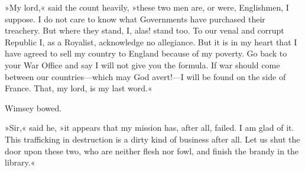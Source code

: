 »My lord,« said the count heavily, »these two men are, or were, Englishmen, I suppose. I do not care to know what Governments have purchased their treachery. But where they stand, I, alas! stand too. To our venal and corrupt Republic I, as a Royalist, acknowledge no allegiance. But it is in my heart that I have agreed to sell my country to England because of my poverty. Go back to your War Office and say I will not give you the formula. If war should come between our countries—which may God avert!—I will be found on the side of France. That, my lord, is my last word.«

Wimsey bowed.

»Sir,« said he, »it appears that my mission has, after all, failed. I am glad of it. This trafficking in destruction is a dirty kind of business after all. Let us shut the door upon these two, who are neither flesh nor fowl, and finish the brandy in the library.«